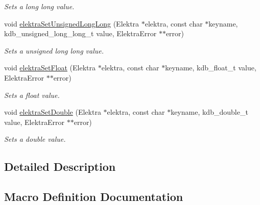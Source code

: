 \begin{DoxyCompactItemize}
\begin{DoxyCompactList}\small\item\em Sets a long long value. \end{DoxyCompactList}\item 
void \hyperlink{group__highlevel_ga4aba418539ac27449193b8f8cb761734}{elektra\+Set\+Unsigned\+Long\+Long} (Elektra $\ast$elektra, const char $\ast$keyname, kdb\+\_\+unsigned\+\_\+long\+\_\+long\+\_\+t value, Elektra\+Error $\ast$$\ast$error)
\begin{DoxyCompactList}\small\item\em Sets a unsigned long long value. \end{DoxyCompactList}\item 
void \hyperlink{group__highlevel_gae9f490191adb55639c70501e1ca3fbe8}{elektra\+Set\+Float} (Elektra $\ast$elektra, const char $\ast$keyname, kdb\+\_\+float\+\_\+t value, Elektra\+Error $\ast$$\ast$error)
\begin{DoxyCompactList}\small\item\em Sets a float value. \end{DoxyCompactList}\item 
void \hyperlink{group__highlevel_ga803c1b5131516de24bc81c94aca44bbd}{elektra\+Set\+Double} (Elektra $\ast$elektra, const char $\ast$keyname, kdb\+\_\+double\+\_\+t value, Elektra\+Error $\ast$$\ast$error)
\begin{DoxyCompactList}\small\item\em Sets a double value. \end{DoxyCompactList}\end{DoxyCompactItemize}


\subsection{Detailed Description}


\subsection{Macro Definition Documentation}
\mbox{\label{group__highlevel_gad2b8a6e7493d6128d38d9ac68906fb62}} 

